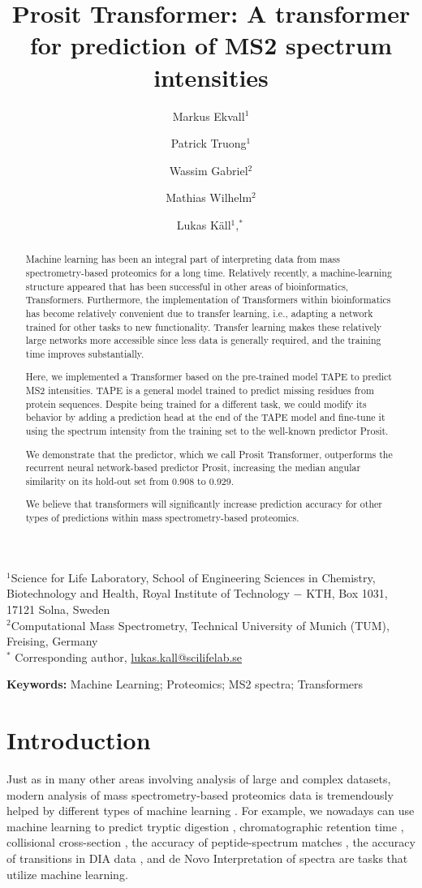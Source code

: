 \documentclass[10pt,a4paper]{article}
\title{Prosit Transformer: A transformer for prediction of MS2 spectrum intensities}
\author{Markus Ekvall$^1$ \and Patrick Truong$^1$ \and Wassim Gabriel$^2$ \and Mathias Wilhelm$^2$ \and Lukas K\"{a}ll$^1,^*$}
\begin{document}
\maketitle
$^1$Science for Life Laboratory, School of Engineering Sciences in Chemistry, Biotechnology and Health, Royal Institute of Technology − KTH, Box 1031, 17121 Solna, Sweden\\
$^2$Computational Mass Spectrometry, Technical University of Munich (TUM), Freising, Germany\\
$^*$ Corresponding author, \url{lukas.kall@scilifelab.se}

\begin{abstract}
Machine learning has been an integral part of interpreting data from mass spectrometry-based proteomics for a long time. Relatively recently, a machine-learning structure appeared that has been successful in other areas of bioinformatics, Transformers. Furthermore, the implementation of Transformers within bioinformatics has become relatively convenient due to transfer learning, i.e., adapting a network trained for other tasks to new functionality. Transfer learning makes these relatively large networks more accessible since less data is generally required, and the training time improves substantially.

Here, we implemented a Transformer based on the pre-trained model TAPE to predict MS2 intensities. TAPE is a general model trained to predict missing residues from protein sequences. Despite being trained for a different task, we could modify its behavior by adding a prediction head at the end of the TAPE model and fine-tune it using the spectrum intensity from the training set to the well-known predictor Prosit.

We demonstrate that the predictor, which we call Prosit Transformer, outperforms the recurrent neural network-based predictor Prosit, increasing the median angular similarity on its hold-out set from 0.908 to 0.929.

We believe that transformers will significantly increase prediction accuracy for other types of predictions within mass spectrometry-based proteomics.
\end{abstract}

{\bf Keywords:} Machine Learning; Proteomics; MS2 spectra; Transformers

\section*{Introduction}
Just as in many other areas involving analysis of large and complex datasets, modern analysis of mass spectrometry-based proteomics data is tremendously helped by different types of machine learning \cite{Meyer2021-hc,Mann2021-kx}. For example, we nowadays can use machine learning to predict tryptic digestion \cite{Yang2021-ng}, chromatographic retention time \cite{Moruz2010-ls,Ma2018-wy,Martens_undated-vs}, collisional cross-section \cite{Meier2021-ur}, the accuracy of peptide-spectrum matches \cite{Kall2007-ll}, the accuracy of transitions in DIA data \cite{Demichev2020-zd}, and de Novo Interpretation of spectra \cite{Tran2017-lk} are tasks that utilize machine learning.
\end{document}
